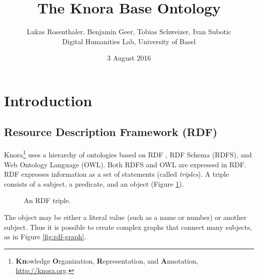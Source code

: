 \documentclass[12pt, a4paper]{article}
\title{The Knora Base Ontology}
\author{Lukas Rosenthaler, Benjamin Geer, Tobias Schweizer, Ivan Subotic\\Digital Humanities Lab, University of Basel}
\date{3 August 2016}
\begin{document}
\maketitle

\listoftodos

\tableofcontents

\section{Introduction}

\subsection{Resource Description Framework (RDF)}
Knora\footnote{{\bf Kn}owledge {\bf O}rganization, {\bf R}epresentation, and {\bf A}nnotation, \url{http://knora.org}.} uses a hierarchy of ontologies based on RDF \cite{RDF_Primer_1_1}, RDF Schema (RDFS)\cite{RDF_Schema_1_1}, and Web Ontology Language (OWL)\cite{OWL_2_Primer}. Both RDFS and OWL are expressed in RDF. RDF expresses information as a set of statements (called {\em triples}). A triple consists of a subject, a predicate, and an object (Figure \ref{fig:rdf-triple}).

\begin{figure}[h]
\centering
{}
\caption{An RDF triple.}
\label{fig:rdf-triple}
\end{figure}

The object may be either a literal value (such as a name or number) or another subject. Thus it is possible to create complex graphs that connect many subjects, as in Figure \ref{fig:rdf-graph}.
\end{document}
